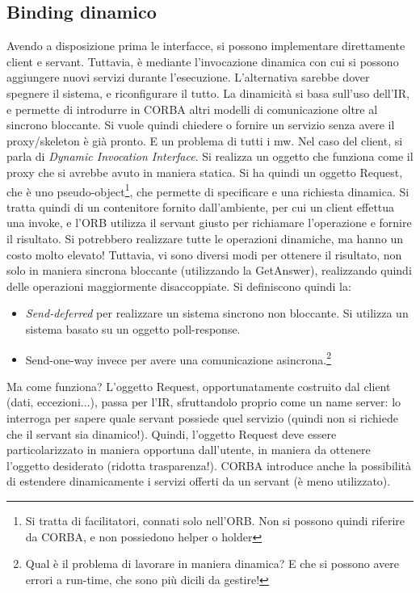 \subsection{Binding dinamico}
Avendo a disposizione prima le interfacce, si possono implementare direttamente client e servant. Tuttavia, è mediante
l'invocazione dinamica con cui si possono aggiungere nuovi servizi durante l'esecuzione. L'alternativa sarebbe
dover spegnere il sistema, e riconfigurare il tutto. La dinamicità si basa sull'uso dell'IR, e permette di introdurre in 
CORBA altri modelli di comunicazione oltre al sincrono bloccante.
Si vuole quindi chiedere o fornire un servizio senza avere il proxy/skeleton è già pronto. E un problema di tutti i mw.
Nel caso del client, si parla di \textit{Dynamic Invocation Interface}. Si realizza un oggetto che funziona come il 
proxy che si avrebbe avuto in maniera statica. Si ha quindi un oggetto Request, che è uno pseudo-object\footnote{Si 
tratta di facilitatori, connati solo nell'ORB. Non si possono quindi riferire da CORBA,
e non possiedono helper o holder}, che permette di specificare e una richiesta dinamica. Si tratta quindi di un 
contenitore fornito dall'ambiente, per cui un client effettua una invoke, e l'ORB utilizza il servant giusto per
richiamare l'operazione e fornire il risultato. Si potrebbero realizzare tutte le operazioni dinamiche, ma hanno un 
costo molto elevato! Tuttavia, vi sono diversi modi per ottenere il risultato, non solo in maniera sincrona bloccante
(utilizzando la GetAnswer), realizzando quindi delle operazioni maggiormente disaccoppiate. Si definiscono quindi la:
\begin{itemize}
 \item \textit{Send-deferred} per realizzare un sistema sincrono non bloccante. Si utilizza un sistema basato su un 
 oggetto poll-response.
 \item Send-one-way invece per avere una comunicazione asincrona.\footnote{Qual è il problema di lavorare in maniera 
 dinamica? E che si possono avere errori a run-time, che sono più dicili da gestire!}
\end{itemize}
Ma come funziona? L'oggetto Request, opportunatamente costruito dal client (dati, eccezioni...), passa per l'IR, 
sfruttandolo proprio come un name server: lo interroga per sapere quale servant possiede quel servizio (quindi non si
richiede che il servant sia dinamico!). Quindi, l'oggetto Request deve essere particolarizzato in maniera opportuna
dall'utente, in maniera da ottenere l'oggetto desiderato (ridotta trasparenza!).
CORBA introduce anche la possibilità di estendere dinamicamente i servizi offerti da un servant (è meno utilizzato). 

